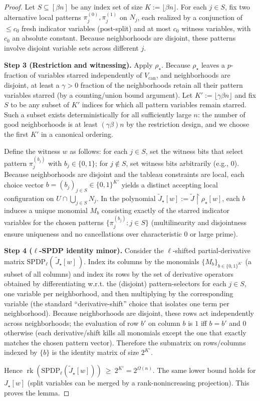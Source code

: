 \documentclass[12pt]{article}
\theoremstyle{definition}
\theoremstyle{definition}
\theoremstyle{remark}
\theoremstyle{remark}
\begin{document}
\begin{proof}
Let $S\subseteq[\beta n]$ be any index set of size $K:=\lfloor\beta n\rfloor$. For each $j\in S$, fix two alternative local patterns $\pi_j^{(0)},\pi_j^{(1)}$ on $N_j$, each realized by a conjunction of $\le c_0$ fresh indicator variables (post-split) and at most $c_0$ witness variables, with $c_0$ an absolute constant. Because neighborhoods are disjoint, these patterns involve disjoint variable sets across different $j$.

\textbf{Step 3 (Restriction and witnessing).}
Apply $\rho_\star$. Because $\rho_\star$ leaves a $p$-fraction of variables starred independently of $V_{\mathrm{can}}$, and neighborhoods are disjoint, at least a $\gamma>0$ fraction of the neighborhoods retain all their pattern variables starred (by a counting/union bound argument). Let $K':=\lfloor\gamma\beta n\rfloor$ and fix $S$ to be any subset of $K'$ indices for which all pattern variables remain starred. Such a subset exists deterministically for all sufficiently large $n$: the number of good neighborhoods is at least $(\gamma\beta)n$ by the restriction design, and we choose the first $K'$ in a canonical ordering.

Define the witness $w$ as follows: for each $j\in S$, set the witness bits that select pattern $\pi_j^{(b_j)}$ with $b_j\in\{0,1\}$; for $j\notin S$, set witness bits arbitrarily (e.g., $0$). Because neighborhoods are disjoint and the tableau constraints are local, each choice vector $b=(b_j)_{j\in S}\in\{0,1\}^{K'}$ yields a distinct accepting local configuration on $U\cap\bigcup_{j\in S}N_j$. In the polynomial $\tilde{J}_\star[w]:=\tilde{J}\upharpoonright\rho_\star[w]$, each $b$ induces a unique monomial $M_b$ consisting exactly of the starred indicator variables for the chosen patterns $\{\pi_j^{(b_j)}:j\in S\}$ (multilinearity and disjointness ensure uniqueness and no cancellations over characteristic $0$ or large prime).

\textbf{Step 4 ($\ell$-SPDP identity minor).}
Consider the $\ell$-shifted partial-derivative matrix $\mathrm{SPDP}_\ell(\,\tilde{J}_\star[w]\,)$. Index its columns by the monomials $\{M_b\}_{b\in\{0,1\}^{K'}}$ (a subset of all columns) and index its rows by the set of derivative operators obtained by differentiating w.r.t. the (disjoint) pattern-selectors for each $j\in S$, one variable per neighborhood, and then multiplying by the corresponding variable (the standard ``derivative-shift'' choice that isolates one term per neighborhood). Because neighborhoods are disjoint, these rows act independently across neighborhoods; the evaluation of row $b'$ on column $b$ is $1$ iff $b=b'$ and $0$ otherwise (each derivative/shift kills all monomials except the one that exactly matches the chosen pattern vector). Therefore the submatrix on rows/columns indexed by $\{b\}$ is the identity matrix of size $2^{K'}$.

Hence $\operatorname{rk}(\mathrm{SPDP}_\ell(\tilde{J}_\star[w]))\ \ge\ 2^{K'}=2^{\Omega(n)}$. The same lower bound holds for $J_\star[w]$ (split variables can be merged by a rank-nonincreasing projection). This proves the lemma.
\end{proof}
\end{document}
